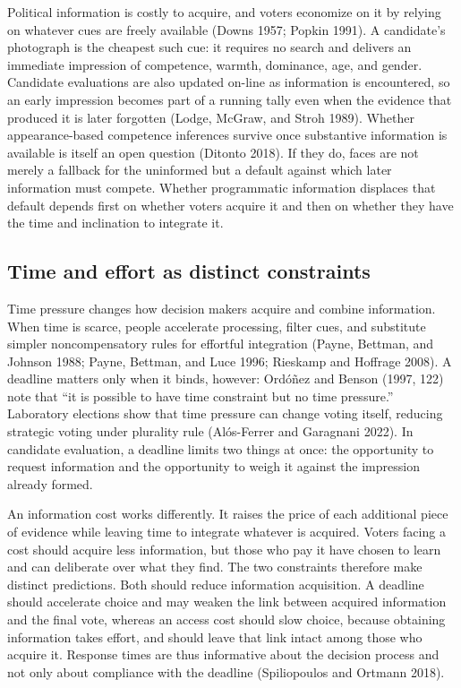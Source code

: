 \documentclass[11pt]{article}\usepackage[]{graphicx}\usepackage[]{xcolor}
\begin{document}
Political information is costly to acquire, and voters economize on it by relying on whatever cues are freely available (Downs 1957; Popkin 1991). A candidate's photograph is the cheapest such cue: it requires no search and delivers an immediate impression of competence, warmth, dominance, age, and gender. Candidate evaluations are also updated on-line as information is encountered, so an early impression becomes part of a running tally even when the evidence that produced it is later forgotten (Lodge, McGraw, and Stroh 1989). Whether appearance-based competence inferences survive once substantive information is available is itself an open question (Ditonto 2018). If they do, faces are not merely a fallback for the uninformed but a default against which later information must compete. Whether programmatic information displaces that default depends first on whether voters acquire it and then on whether they have the time and inclination to integrate it.

\subsection{Time and effort as distinct constraints}

Time pressure changes how decision makers acquire and combine information. When time is scarce, people accelerate processing, filter cues, and substitute simpler noncompensatory rules for effortful integration (Payne, Bettman, and Johnson 1988; Payne, Bettman, and Luce 1996; Rieskamp and Hoffrage 2008). A deadline matters only when it binds, however: Ord\'o\~nez and Benson (1997, 122) note that ``it is possible to have time constraint but no time pressure.'' Laboratory elections show that time pressure can change voting itself, reducing strategic voting under plurality rule (Al\'os-Ferrer and Garagnani 2022). In candidate evaluation, a deadline limits two things at once: the opportunity to request information and the opportunity to weigh it against the impression already formed.

An information cost works differently. It raises the price of each additional piece of evidence while leaving time to integrate whatever is acquired. Voters facing a cost should acquire less information, but those who pay it have chosen to learn and can deliberate over what they find. The two constraints therefore make distinct predictions. Both should reduce information acquisition. A deadline should accelerate choice and may weaken the link between acquired information and the final vote, whereas an access cost should slow choice, because obtaining information takes effort, and should leave that link intact among those who acquire it. Response times are thus informative about the decision process and not only about compliance with the deadline (Spiliopoulos and Ortmann 2018).
\end{document}
